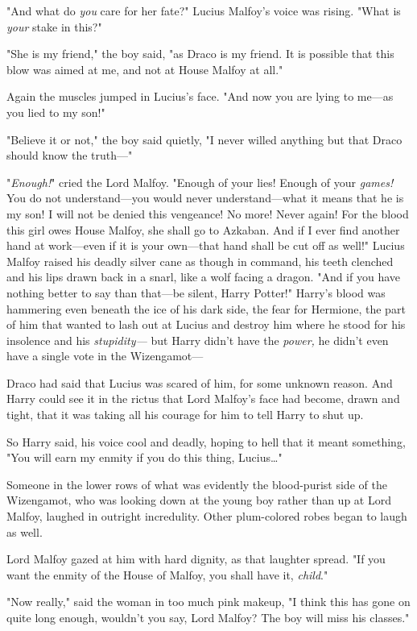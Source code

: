 "And what do \emph{you} care for her fate?" Lucius Malfoy's voice was rising. 
"What is \emph{your} stake in this?"

"She is my friend," the boy said, "as Draco is my friend. It is possible that 
this blow was aimed at me, and not at House Malfoy at all."

Again the muscles jumped in Lucius's face. "And now you are lying to me---as 
you lied to my son!"

"Believe it or not," the boy said quietly, "I never willed anything but that 
Draco should know the truth---"

"\emph{Enough!}" cried the Lord Malfoy. "Enough of your lies! Enough of your 
\emph{games!} You do not understand---you would never understand---what it 
means that he is my son! I will not be denied this vengeance! No more! Never 
again! For the blood this girl owes House Malfoy, she shall go to Azkaban. And 
if I ever find another hand at work---even if it is your own---that hand shall 
be cut off as well!" Lucius Malfoy raised his deadly silver cane as though in 
command, his teeth clenched and his lips drawn back in a snarl, like a wolf 
facing a dragon. "And if you have nothing better to say than that---be silent, 
Harry Potter!"
\sbreak
Harry's blood was hammering even beneath the ice of his dark side, the fear for 
Hermione, the part of him that wanted to lash out at Lucius and destroy him 
where he stood for his insolence and his \emph{stupidity---} but Harry didn't 
have the \emph{power,} he didn't even have a single vote in the Wizengamot---

Draco had said that Lucius was scared of him, for some unknown reason. And 
Harry could see it in the rictus that Lord Malfoy's face had become, drawn and 
tight, that it was taking all his courage for him to tell Harry to shut up.

So Harry said, his voice cool and deadly, hoping to hell that it meant 
something, "You will earn my enmity if you do this thing, Lucius{\ldots}"

Someone in the lower rows of what was evidently the blood-purist side of the 
Wizengamot, who was looking down at the young boy rather than up at Lord 
Malfoy, laughed in outright incredulity. Other plum-colored robes began to 
laugh as well.

Lord Malfoy gazed at him with hard dignity, as that laughter spread. "If you 
want the enmity of the House of Malfoy, you shall have it, \emph{child}."

"Now really," said the woman in too much pink makeup, "I think this has gone on 
quite long enough, wouldn't you say, Lord Malfoy? The boy will miss his 
classes."

